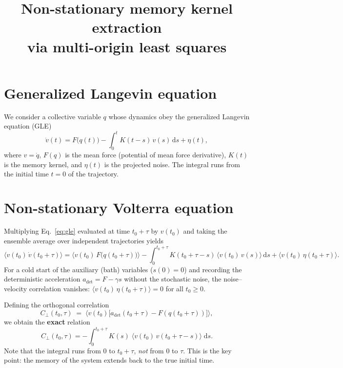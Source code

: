 \documentclass[11pt]{article}
\title{Non-stationary memory kernel extraction\\via multi-origin least squares}
\author{}
\date{}
\newcommand{\avg}[1]{\langle #1 \rangle}
\newcommand{\dd}{\mathrm{d}}
\begin{document}
\maketitle

\section{Generalized Langevin equation}

We consider a collective variable $q$ whose dynamics obey the generalized Langevin equation (GLE)
\begin{equation}\label{eq:gle}
  \dot v(t) = F\bigl(q(t)\bigr)
    - \int_0^{t} K(t-s)\,v(s)\,\dd s
    + \eta(t),
\end{equation}
where $v = \dot q$, $F(q)$ is the mean force (potential of mean force derivative),
$K(t)$ is the memory kernel, and $\eta(t)$ is the projected noise.
The integral runs from the initial time $t=0$ of the trajectory.

\section{Non-stationary Volterra equation}

Multiplying Eq.~\eqref{eq:gle} evaluated at time $t_0 + \tau$ by $v(t_0)$
and taking the ensemble average over independent trajectories yields
\begin{equation}\label{eq:volterra_full}
  \avg{v(t_0)\,\dot v(t_0+\tau)}
  = \avg{v(t_0)\,F\bigl(q(t_0+\tau)\bigr)}
  - \int_0^{t_0+\tau} K(t_0+\tau-s)\,\avg{v(t_0)\,v(s)}\,\dd s
  + \avg{v(t_0)\,\eta(t_0+\tau)}.
\end{equation}
For a cold start of the auxiliary (bath) variables ($s(0)=0$) and recording
the deterministic acceleration $a_{\mathrm{det}} = F - \gamma s$ without the
stochastic noise, the noise--velocity correlation vanishes:
$\avg{v(t_0)\,\eta(t_0+\tau)} = 0$ for all $t_0 \geq 0$.

Defining the orthogonal correlation
\begin{equation}
  C_{\perp}(t_0,\tau)
  \;=\; \avg{v(t_0)\bigl[a_{\mathrm{det}}(t_0+\tau) - F(q(t_0+\tau))\bigr]},
\end{equation}
we obtain the \textbf{exact} relation
\begin{equation}\label{eq:volterra_exact}
  \boxed{
  C_{\perp}(t_0,\tau)
  = -\int_0^{t_0+\tau} K(s)\;\avg{v(t_0)\,v(t_0+\tau-s)}\;\dd s.
  }
\end{equation}
Note that the integral runs from $0$ to $t_0+\tau$, \emph{not} from $0$ to $\tau$.
This is the key point: the memory of the system extends back to the true initial time.
\end{document}
